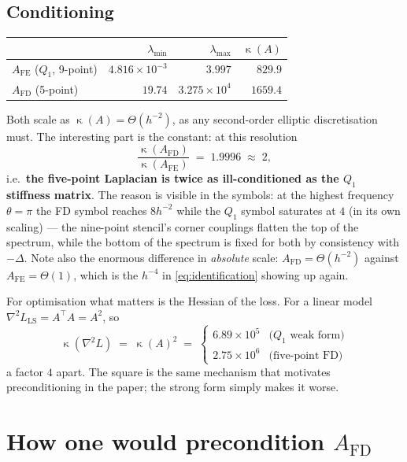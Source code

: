 \documentclass[11pt]{article}
\newcommand{\Afd}{A_{\mathrm{FD}}}
\newcommand{\Afe}{A_{\mathrm{FE}}}
\DeclareMathOperator{\cond}{\kappa}
\begin{document}
\subsection{Conditioning}

\begin{center}
\begin{tabular}{lrrr}
\toprule
& $\lambda_{\min}$ & $\lambda_{\max}$ & $\cond(A)$ \\
\midrule
$\Afe$ ($Q_1$, 9-point) & $4.816\times10^{-3}$ & $3.997$              & $829.9$  \\
$\Afd$ (5-point)        & $19.74$              & $3.275\times10^{4}$  & $1659.4$ \\
\bottomrule
\end{tabular}
\end{center}

Both scale as $\cond(A) = \Theta(h^{-2})$, as any second-order elliptic discretisation must. The
interesting part is the constant: at this resolution
\begin{equation}
  \frac{\cond(\Afd)}{\cond(\Afe)} \;=\; 1.9996 \;\approx\; 2 ,
\end{equation}
i.e.\ \textbf{the five-point Laplacian is twice as ill-conditioned as the $Q_1$ stiffness matrix}.
The reason is visible in the symbols: at the highest frequency $\theta=\pi$ the FD symbol reaches
$8h^{-2}$ while the $Q_1$ symbol saturates at $4$ (in its own scaling) --- the nine-point stencil's
corner couplings flatten the top of the spectrum, while the bottom of the spectrum is fixed for
both by consistency with $-\Delta$. Note also the enormous difference in \emph{absolute} scale:
$\Afd = \Theta(h^{-2})$ against $\Afe = \Theta(1)$, which is the $h^{-4}$ in
\eqref{eq:identification} showing up again.

For optimisation what matters is the Hessian of the loss. For a linear model
$\nabla^2 L_{\mathrm{LS}} = A^\top A = A^2$, so
\begin{equation}
  \cond(\nabla^2 L) \;=\; \cond(A)^2 \;=\;
  \begin{cases}
    6.89\times10^{5} & \text{($Q_1$ weak form)} \\
    2.75\times10^{6} & \text{(five-point FD)}
  \end{cases}
\end{equation}
a factor $4$ apart. The square is the same mechanism that motivates preconditioning in the paper;
the strong form simply makes it worse.

\section{How one would precondition \texorpdfstring{$\Afd$}{A\_FD}}
\end{document}
